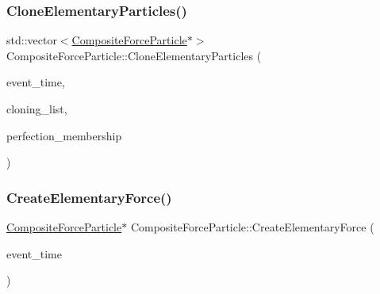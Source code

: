 \subsubsection{\texorpdfstring{Clone\+Elementary\+Particles()}{CloneElementaryParticles()}}
{\footnotesize\ttfamily std\+::vector$<$\mbox{\hyperlink{classCompositeForceParticle}{Composite\+Force\+Particle}}$\ast$$>$ Composite\+Force\+Particle\+::\+Clone\+Elementary\+Particles (\begin{DoxyParamCaption}\item[{std\+::chrono\+::time\+\_\+point$<$ \mbox{\hyperlink{universe_8h_a0ef8d951d1ca5ab3cfaf7ab4c7a6fd80}{Clock}} $>$}]{event\+\_\+time,  }\item[{std\+::vector$<$ \mbox{\hyperlink{classCompositeForceParticle}{Composite\+Force\+Particle}} $\ast$$>$}]{cloning\+\_\+list,  }\item[{double}]{perfection\+\_\+membership }\end{DoxyParamCaption})}

\mbox{\label{classCompositeForceParticle_a490b3eed8b9dbcc3edf44a9747ef6dbb}} 
\subsubsection{\texorpdfstring{Create\+Elementary\+Force()}{CreateElementaryForce()}}
{\footnotesize\ttfamily \mbox{\hyperlink{classCompositeForceParticle}{Composite\+Force\+Particle}}$\ast$ Composite\+Force\+Particle\+::\+Create\+Elementary\+Force (\begin{DoxyParamCaption}\item[{std\+::chrono\+::time\+\_\+point$<$ \mbox{\hyperlink{universe_8h_a0ef8d951d1ca5ab3cfaf7ab4c7a6fd80}{Clock}} $>$}]{event\+\_\+time }\end{DoxyParamCaption})}

\mbox{\label{classCompositeForceParticle_a56e006b0aa4b54401db763782294de62}} 
